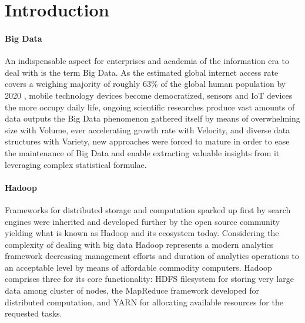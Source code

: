 \documentclass[review]{elsarticle}
\begin{document}
\linenumbers

\section{Introduction}

\paragraph{Big Data}An indispensable aspect for enterprises and academia of the information era to deal with is the term Big Data. As the estimated global internet access rate covers a weighing majority of roughly 63\% of the global human population by 2020 \cite{noauthor_world_nodate}, mobile technology devices become democratized, sensors and IoT devices the more occupy daily life, ongoing scientific researches produce vast amounts of data outputs the Big Data phenomenon gathered itself by means of overwhelming size with Volume, ever accelerating growth rate with Velocity, and diverse data structures with Variety, new approaches were forced to mature in order to ease the maintenance of Big Data and enable extracting valuable insights from it leveraging complex statistical formulae.

\paragraph{Hadoop \cite{noauthor_apache_nodate}}Frameworks for distributed storage and computation sparked up first by search engines were inherited and developed further by the open source community yielding what is known as Hadoop and its ecosystem today. Considering the complexity of dealing with big data Hadoop represents a modern analytics framework decreasing management efforts and duration of analytics operations to an acceptable level by means of affordable commodity computers. Hadoop comprises three for its core functionality: HDFS filesystem for storing very large data among cluster of nodes, the MapReduce framework developed for distributed computation, and YARN for allocating available resources for the requested tasks.
\end{document}
